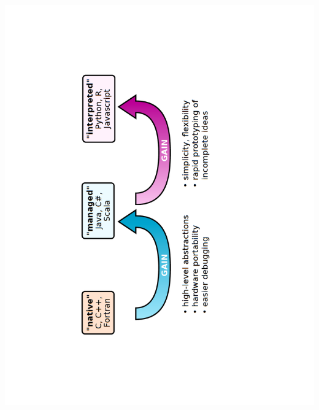 \documentclass[10pt, t]{beamer}
\begin{document}
\begin{frame}{} %
\begin{columns}
\includegraphics[angle=-90,width=\linewidth]{figures/languages5.pdf}
\end{columns}
\end{frame}
\end{document}
